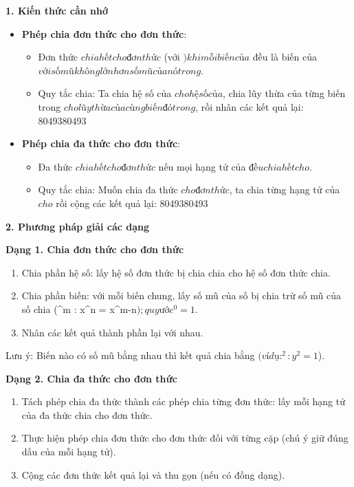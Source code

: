\textbf{1. Kiến thức cần nhớ}
\begin{itemize}
\item \textbf{Phép chia đơn thức cho đơn thức}:
\begin{itemize}
\item Đơn thức $ chia hết cho đơn thức $ (với  $) khi mỗi biến của $ đều là biến của $ với số mũ không lớn hơn số mũ của nó trong $.
\item Quy tắc chia: Ta chia hệ số của $ cho hệ số của $, chia lũy thừa của từng biến trong $ cho lũy thừa của cùng biến đó trong $, rồi nhân các kết quả lại:
8049380493
\end{itemize}
\item \textbf{Phép chia đa thức cho đơn thức}:
\begin{itemize}
\item Đa thức $ chia hết cho đơn thức $ nếu mọi hạng tử của $ đều chia hết cho $.
\item Quy tắc chia: Muốn chia đa thức $ cho đơn thức $, ta chia từng hạng tử của $ cho $ rồi cộng các kết quả lại:
8049380493
\end{itemize}
\end{itemize}

\textbf{2. Phương pháp giải các dạng}

\textbf{Dạng 1. Chia đơn thức cho đơn thức}
\begin{enumerate}
\item Chia phần hệ số: lấy hệ số đơn thức bị chia chia cho hệ số đơn thức chia.
\item Chia phần biến: với mỗi biến chung, lấy số mũ của số bị chia trừ số mũ của số chia (^m : x^n = x^{m-n}$); quy ước ^0 = 1$.
\item Nhân các kết quả thành phần lại với nhau.
\end{enumerate}
Lưu ý: Biến nào có số mũ bằng nhau thì kết quả chia bằng $ (ví dụ: ^2 : y^2 = 1$).

\textbf{Dạng 2. Chia đa thức cho đơn thức}
\begin{enumerate}
\item Tách phép chia đa thức thành các phép chia từng đơn thức: lấy mỗi hạng tử của đa thức chia cho đơn thức.
\item Thực hiện phép chia đơn thức cho đơn thức đối với từng cặp (chú ý giữ đúng dấu của mỗi hạng tử).
\item Cộng các đơn thức kết quả lại và thu gọn (nếu có đồng dạng).
\end{enumerate}

